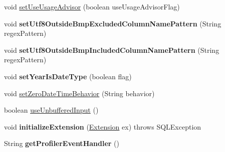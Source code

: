 \begin{DoxyCompactItemize}
\item 
void \mbox{\hyperlink{classcom_1_1mysql_1_1jdbc_1_1jdbc2_1_1optional_1_1_connection_wrapper_a1d58ba31c123593e3f79773f45777674}{set\+Use\+Usage\+Advisor}} (boolean use\+Usage\+Advisor\+Flag)
\item 
\mbox{\label{classcom_1_1mysql_1_1jdbc_1_1jdbc2_1_1optional_1_1_connection_wrapper_a0260e94cbda07985f93bd9d87aca1fab}} 
void {\bfseries set\+Utf8\+Outside\+Bmp\+Excluded\+Column\+Name\+Pattern} (String regex\+Pattern)
\item 
\mbox{\label{classcom_1_1mysql_1_1jdbc_1_1jdbc2_1_1optional_1_1_connection_wrapper_aaa271619c3f55ff4e9826938f9befb0e}} 
void {\bfseries set\+Utf8\+Outside\+Bmp\+Included\+Column\+Name\+Pattern} (String regex\+Pattern)
\item 
\mbox{\label{classcom_1_1mysql_1_1jdbc_1_1jdbc2_1_1optional_1_1_connection_wrapper_a5bf4713fee64759e25d09262183cc685}} 
void {\bfseries set\+Year\+Is\+Date\+Type} (boolean flag)
\item 
void \mbox{\hyperlink{classcom_1_1mysql_1_1jdbc_1_1jdbc2_1_1optional_1_1_connection_wrapper_a5514653da00c94961479c2ad44b0cc5f}{set\+Zero\+Date\+Time\+Behavior}} (String behavior)
\item 
boolean \mbox{\hyperlink{classcom_1_1mysql_1_1jdbc_1_1jdbc2_1_1optional_1_1_connection_wrapper_ae90cf2a8ef9234c774cf9567b48f755f}{use\+Unbuffered\+Input}} ()
\item 
\mbox{\label{classcom_1_1mysql_1_1jdbc_1_1jdbc2_1_1optional_1_1_connection_wrapper_a162a7350853e1a0bcf12e7dff2a6c2cc}} 
void {\bfseries initialize\+Extension} (\mbox{\hyperlink{interfacecom_1_1mysql_1_1jdbc_1_1_extension}{Extension}} ex)  throws S\+Q\+L\+Exception 
\item 
\mbox{\label{classcom_1_1mysql_1_1jdbc_1_1jdbc2_1_1optional_1_1_connection_wrapper_a8422e7c64903b015f30c810c6ff30c04}} 
String {\bfseries get\+Profiler\+Event\+Handler} ()
\item 
\mbox{\label{classcom_1_1mysql_1_1jdbc_1_1jdbc2_1_1optional_1_1_connection_wrapper_a1fcbf985fcba74c388a010dd170c404d}} 

\end{DoxyCompactItemize}
